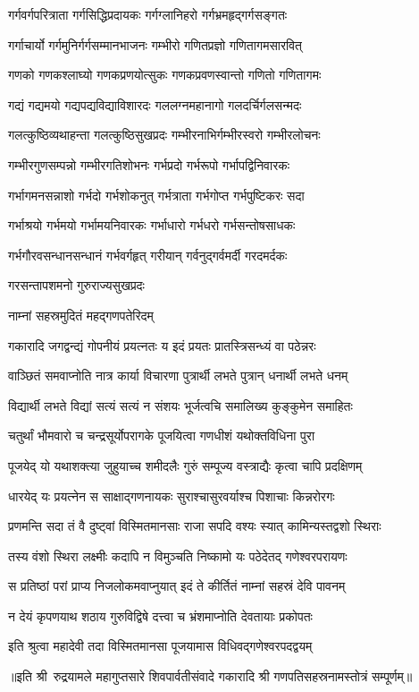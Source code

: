 \twolineshloka
{गर्गवर्गपरित्राता गर्गसिद्धिप्रदायकः}%
{गर्गग्लानिहरो गर्गभ्रमहृद्गर्गसङ्गतः}%

\twolineshloka
{गर्गाचार्यो गर्गमुनिर्गर्गसम्मानभाजनः}%
{गम्भीरो गणितप्रज्ञो गणितागमसारवित्}%

\twolineshloka
{गणको गणकश्लाघ्यो गणकप्रणयोत्सुकः}%
{गणकप्रवणस्वान्तो गणितो गणितागमः}%

\twolineshloka
{गद्यं गद्यमयो गद्यपद्यविद्याविशारदः}%
{गललग्नमहानागो गलदर्चिर्गलसन्मदः}%

\twolineshloka
{गलत्कुष्ठिव्यथाहन्ता गलत्कुष्ठिसुखप्रदः}%
{गम्भीरनाभिर्गम्भीरस्वरो गम्भीरलोचनः}%

\twolineshloka
{गम्भीरगुणसम्पन्नो गम्भीरगतिशोभनः}%
{गर्भप्रदो गर्भरूपो गर्भापद्विनिवारकः}%

\twolineshloka
{गर्भागमनसन्नाशो गर्भदो गर्भशोकनुत्}%
{गर्भत्राता गर्भगोप्त गर्भपुष्टिकरः सदा}%

\twolineshloka
{गर्भाश्रयो गर्भमयो गर्भामयनिवारकः}%
{गर्भाधारो गर्भधरो गर्भसन्तोषसाधकः}%

\twolineshloka
{गर्भगौरवसन्धानसन्धानं गर्भवर्गहृत्}%
{गरीयान् गर्वनुद्गर्वमर्दी गरदमर्दकः}%

{गरसन्तापशमनो गुरुराज्यसुखप्रदः}%

\onelineshloka
{नाम्नां सहस्रमुदितं महद्गणपतेरिदम्}%


\twolineshloka
{गकारादि जगद्वन्द्यं गोपनीयं प्रयत्नतः}%
{य इदं प्रयतः प्रातस्त्रिसन्ध्यं वा पठेन्नरः}%

\twolineshloka
{वाञ्छितं समवाप्नोति नात्र कार्या विचारणा}%
{पुत्रार्थी लभते पुत्रान् धनार्थी लभते धनम्}%

\twolineshloka
{विद्यार्थी लभते विद्यां सत्यं सत्यं न संशयः}%
{भूर्जत्वचि समालिख्य कुङ्कुमेन समाहितः}%

\twolineshloka
{चतुर्थां भौमवारो च चन्द्रसूर्योपरागके}%
{पूजयित्वा गणधीशं यथोक्तविधिना पुरा}%

\twolineshloka
{पूजयेद् यो यथाशक्त्या जुहुयाच्च शमीदलैः}%
{गुरुं सम्पूज्य वस्त्राद्यैः कृत्वा चापि प्रदक्षिणम्}%

\twolineshloka
{धारयेद् यः प्रयत्नेन स साक्षाद्गणनायकः}%
{सुराश्चासुरवर्याश्च पिशाचाः किन्नरोरगः}%

\twolineshloka
{प्रणमन्ति सदा तं वै दुष्ट्वां विस्मितमानसाः}%
{राजा सपदि वश्यः स्यात् कामिन्यस्तद्वशो स्थिराः}%

\twolineshloka
{तस्य वंशो स्थिरा लक्ष्मीः कदापि न विमुञ्चति}%
{निष्कामो यः पठेदेतद् गणेश्वरपरायणः}%

\twolineshloka
{स प्रतिष्ठां परां प्राप्य निजलोकमवाप्नुयात्}%
{इदं ते कीर्तितं नाम्नां सहस्रं देवि पावनम्}%

\twolineshloka
{न देयं कृपणयाथ शठाय गुरुविद्विषे}%
{दत्त्वा च भ्रंशमाप्नोति देवतायाः प्रकोपतः}%

\twolineshloka
{इति श्रुत्वा महादेवी तदा विस्मितमानसा}%
{पूजयामास विधिवद्गणेश्वरपदद्वयम्}%

॥इति श्री~रुद्रयामले महागुप्तसारे शिवपार्वतीसंवादे गकारादि श्री गणपतिसहस्रनामस्तोत्रं सम्पूर्णम्॥
